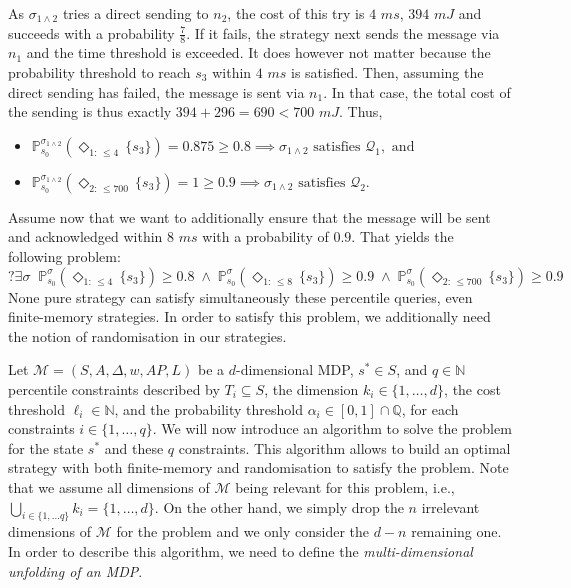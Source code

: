 \begin{example}
  As $\sigma_{1 \wedge 2}$ tries a direct sending to $n_2$,
    the cost of this try is $4$ $ms$, $394$ $mJ$ and succeeds with a probability $\frac{7}{8}$.
    If it fails, the strategy next sends the message via $n_1$ and the time threshold is exceeded.
    It does however not matter because the probability threshold to reach $s_3$ within $4$ $ms$ is satisfied. Then, assuming the direct sending has failed, the message is sent via $n_1$. In that case, the total cost of the sending is thus exactly $394 + 296 = 690 < 700$ $mJ$. Thus,
  \begin{itemize}
    \item $\mathbb{P}_{s_0}^{\sigma_{1 \wedge 2}}(\Diamond_{1:\, \leq 4}\, \{s_3\}) = 0.875 \geq 0.8 \implies \sigma_{1 \wedge 2} \text{ satisfies }\mathcal{Q}_1, \text{ and}$
    \item $\mathbb{P}_{s_0}^{\sigma_{1 \wedge 2}}(\Diamond_{2:\, \leq 700}\, \{s_3\}) = 1 \geq 0.9 \implies \sigma_{1 \wedge 2} \text{ satisfies }\mathcal{Q}_2.$
  \end{itemize}

Assume now that we want to additionally ensure that the message will be sent and acknowledged within $8$ $ms$ with a probability of $0.9$.
That yields the following \SSPPQ{} problem:
\[
  ?\exists \sigma \;\; \mathbb{P}^{\sigma}_{s_0}(\Diamond_{1: \, \leq 4} \, \{s_3\}) \geq 0.8 \; \wedge \;
   \mathbb{P}^{\sigma}_{s_0}(\Diamond_{1: \, \leq 8} \, \{s_3\}) \geq 0.9 \; \wedge \;
  \mathbb{P}_{s_0}^{\sigma}(\Diamond_{2: \, \leq 700} \, \{s_3\}) \geq 0.9
\]
None pure strategy can satisfy simultaneously these percentile queries, even finite-memory strategies.
In order to satisfy this \SSPPQ{} problem, we additionally need the notion of randomisation in our strategies.
\end{example}

Let $\mathcal{M}=(S, A, \Delta, w, AP, L)$ be a $d$-dimensional MDP,
$s^* \in S$, and $q \in \mathbb{N}$ percentile constraints described by
$T_i \subseteq S$, the dimension $k_i \in \{1, \dots, d\}$, the cost threshold $\ell_i \in \mathbb{N}$, and the probability threshold $\alpha_i \in [0, 1] \cap \mathbb{Q}$, for each constraints $i \in \{1, \dots, q\}$.
We will now introduce an algorithm to solve the \SSPPQ{} problem for the state $s^*$ and these $q$ constraints. This algorithm allows to build an optimal strategy with both finite-memory and randomisation to satisfy the problem.
Note that we assume all dimensions of $\mathcal{M}$ being relevant for this problem, i.e., $\bigcup_{i \in \{1, \dots q\}} k_i = \{1, \dots, d\}$.
On the other hand, we simply drop the $n$ irrelevant dimensions of $\mathcal{M}$ for the problem and we only consider the $d-n$ remaining one.
In order to describe this algorithm, we need to define the \textit{multi-dimensional unfolding of an MDP}.

